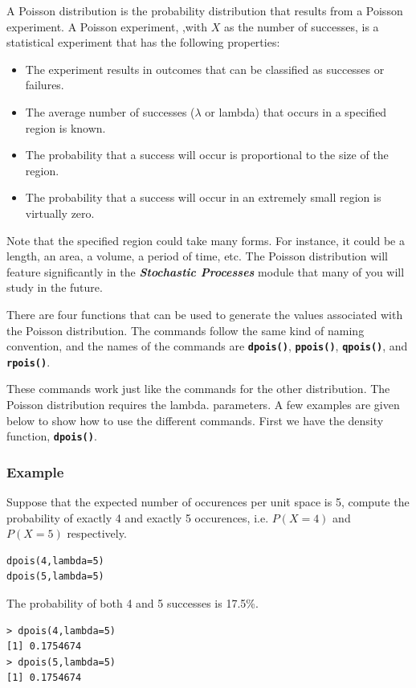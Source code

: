 \documentclass[a4paper,12pt]{article}
\begin{document}
A Poisson distribution is the probability distribution that results from a Poisson experiment. A Poisson experiment, ,with $X$ as the number of successes, is a statistical experiment that has the following properties: 


\begin{itemize}
\item The experiment results in outcomes that can be classified as successes or failures.
\item The average number of successes ($\lambda$ or lambda) that occurs in a specified region is known.
\item The probability that a success will occur is proportional to the size of the region.
\item The probability that a success will occur in an extremely small region is virtually zero. 
\end{itemize}

Note that the specified region could take many forms. For instance, it could be a length, an area, a volume, a period of time, etc. The Poisson distribution will feature significantly in the \textbf{\textit{Stochastic Processes}} module that many of you will study in the future.

There are four functions that can be used to generate the values associated with the Poisson distribution. 
The commands follow the same kind of naming convention, and the names of the commands are \texttt{\textbf{dpois()}}, \texttt{\textbf{ppois()}}, \texttt{\textbf{qpois()}}, and \texttt{\textbf{rpois()}}.

These commands work just like the commands for the other distribution. The Poisson distribution requires the lambda. parameters. A few examples are given below to show how to use the different commands. First we have the density function, \texttt{\textbf{dpois()}}.

\subsubsection{Example}
Suppose that the expected number of occurences per unit space is 5, compute the probability of exactly 4 and exactly 5 occurences, i.e. $P(X = 4)$ and $P(X = 5)$ respectively.

\begin{framed}
\begin{verbatim}
dpois(4,lambda=5)
dpois(5,lambda=5)
\end{verbatim}
\end{framed}
The probability of both 4 and 5 successes is 17.5\%.
\begin{verbatim}
> dpois(4,lambda=5)
[1] 0.1754674
> dpois(5,lambda=5)
[1] 0.1754674
\end{verbatim}
\end{document}
